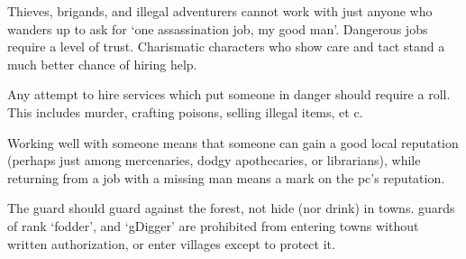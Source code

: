 \begin{multicols}{2}
Thieves, brigands, and illegal adventurers cannot work with just anyone who wanders up to ask for `one assassination job, my good man'.
Dangerous jobs require a level of trust.
Charismatic characters who show care and tact stand a much better chance of hiring help.


Any attempt to hire services which put someone in danger should require a roll.
This includes murder, crafting poisons, selling illegal items, et c.

Working well with someone means that someone can gain a good local reputation (perhaps just among mercenaries, dodgy apothecaries, or librarians), while returning from a job with a missing man means a mark on the \gls{pc}'s reputation.

The \gls{guard} should guard against the forest, not hide (nor drink) in towns.
\Glspl{guard} of rank `\gls{fodder}', and `\gls{gDigger}' are prohibited from entering towns without written authorization, or enter \glspl{village} except to protect it.

\end{multicols}
